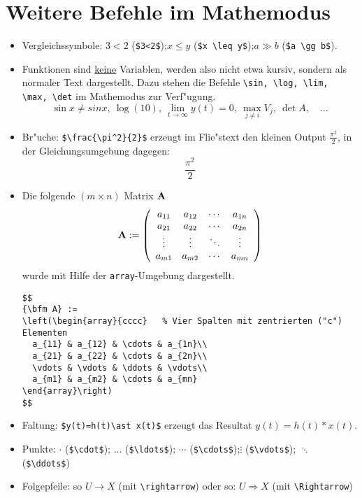 \section{Weitere Befehle im Mathemodus} \label{SECbeisp}
%
\begin{itemize}
\item Vergleichssymbole: $3<2$ (\verb+$3<2$+);\quad  $x \leq y$ (\verb+$x \leq y$+);\quad $a \gg b$ (\verb+$a \gg b$+).
\item Funktionen sind \underline{keine} Variablen, werden also 
      nicht etwa kursiv, sondern als normaler Text dargestellt.
      Dazu stehen die Befehle \verb+\sin, \log, \lim, \max, \det+ im Mathemodus zur Verf"ugung. 
      $$
      \sin{x}\neq sin x, \ \log(10), \ \lim_{t\rightarrow\infty} y(t)=0, \
            \max_{j\neq i} V_j, \ \det{A}, \quad \ldots
      $$
\item Br"uche: \verb+$\frac{\pi^2}{2}$+ erzeugt im Flie"stext den kleinen Output $\frac{\pi^2}{2}$,
      in der Gleichungsumgebung dagegen:
$$\frac{\pi^2}{2}$$
\item Die folgende $(m \times n)$ Matrix ${\mathbf{A}}$ 
%
$$
{\bfm A} := 
\left(\begin{array}{cccc}   %
  a_{11} & a_{12} & \cdots & a_{1n}\\
  a_{21} & a_{22} & \cdots & a_{2n}\\
  \vdots & \vdots & \ddots & \vdots\\
  a_{m1} & a_{m2} & \cdots & a_{mn}
\end{array}\right)
$$
%
wurde mit Hilfe der {\tt array}-Umgebung dargestellt.
%
\begin{verbatim}
$$
{\bfm A} := 
\left(\begin{array}{cccc}   % Vier Spalten mit zentrierten ("c") Elementen
  a_{11} & a_{12} & \cdots & a_{1n}\\
  a_{21} & a_{22} & \cdots & a_{2n}\\
  \vdots & \vdots & \ddots & \vdots\\
  a_{m1} & a_{m2} & \cdots & a_{mn}
\end{array}\right)
$$
\end{verbatim}
\item Faltung: \verb+$y(t)=h(t)\ast x(t)$+ erzeugt das Resultat $y(t)=h(t)\ast x(t)$.
\item Punkte: $\cdot$  (\verb+$\cdot$+); \quad  $\ldots$ (\verb+$\ldots$+);\quad   
              $\cdots$ (\verb+$\cdots$+);\quad  $\vdots$ (\verb+$\vdots$+);\quad
              $\ddots$ (\verb+$\ddots$+)
\item Folgepfeile: so $U \rightarrow X$ (mit \verb+\rightarrow+) oder so: $U \Rightarrow X$ (mit \verb+\Rightarrow+)
%
\end{itemize}


